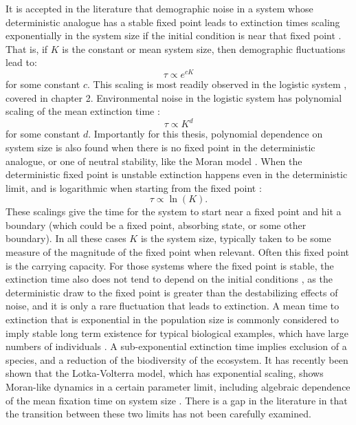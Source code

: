 It is accepted in the literature that demographic noise in a system whose deterministic analogue has a stable fixed point leads to extinction times scaling exponentially in the system size if the initial condition is near that fixed point \cite{Leigh1981,Lande1993,Kamenev2008,Cremer2009a,Dobrinevski2012,Yu2017}. 
That is, if $K$ is the constant or mean system size, then demographic fluctuations lead to:
\begin{equation}
\tau \propto e^{cK}
\end{equation}
for some constant $c$. 
This scaling is most readily observed in the logistic system \cite{Norden1982,Foley1994,Allen2003a,Doering2005,Assaf2006,Assaf2010,Assaf2016}, covered in chapter 2. 
Environmental noise in the logistic system has polynomial scaling of the mean extinction time \cite{Foley1994,Ovaskainen2010}:
\begin{equation}
\tau \propto K^d
\end{equation}
for some constant $d$. 
Importantly for this thesis, polynomial dependence on system size is also found when there is no fixed point in the deterministic analogue, or one of neutral stability, like the Moran model \cite{Cremer2009,Dobrinevski2012}. 
When the deterministic fixed point is unstable extinction happens even in the deterministic limit, and is logarithmic when starting from the fixed point \cite{Lande1993,Dobrinevski2012,Parsons2018}:
\begin{equation}
\tau \propto \ln(K). 
\end{equation}
These scalings give the time for the system to start near a fixed point and hit a boundary (which could be a fixed point, absorbing state, or some other boundary). 
In all these cases $K$ is the system size, typically taken to be some measure of the magnitude of the fixed point when relevant. 
Often this fixed point is the carrying capacity. 
For those systems where the fixed point is stable, the extinction time also does not tend to depend on the initial conditions \cite{Chotibut2015}, as the deterministic draw to the fixed point is greater than the destabilizing effects of noise, and it is only a rare fluctuation that leads to extinction. 
A mean time to extinction that is exponential in the population size is commonly considered to imply stable long term existence for typical biological examples, which have large numbers of individuals \cite{Ovaskainen2010,Lin2015}. 
A sub-exponential extinction time implies exclusion of a species, and a reduction of the biodiversity of the ecosystem. 
It has recently been shown that the Lotka-Volterra model, which has exponential scaling, shows Moran-like dynamics in a certain parameter limit, including algebraic dependence of the mean fixation time on system size \cite{Lin2012,Constable2015,Chotibut2015,Young2018}. 
There is a gap in the literature in that the transition between these two limits has not been carefully examined. 

